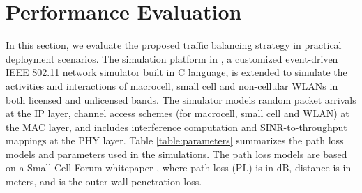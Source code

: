 \documentclass[journal,final,letterpaper,10pt,doublecolumn,twoside]{IEEEtran}
\begin{document}
\section{Performance Evaluation}\label{sec:Femto-system-simulations}

In this section, we evaluate the proposed traffic balancing strategy
in practical deployment scenarios. The simulation platform in
\cite{CoopMAC_WirelessMag2006}\cite{EqualAccess_CoopMAC_Jsac2007}, a
customized event-driven IEEE 802.11 network simulator built in C
language, is extended to simulate the activities and interactions of
macrocell,  small cell and non-cellular WLANs in both licensed and
unlicensed bands. The simulator models random packet arrivals at the
IP layer, channel access schemes (for macrocell, small cell and
WLAN) at the MAC layer, and includes interference computation and
SINR-to-throughput mappings at the PHY layer. Table
\ref{table:parameters} summarizes the path loss models and
parameters used in the simulations. The path loss models are based
on a Small Cell Forum whitepaper \cite{femto-forum-whitepaper}, where
path loss (PL) is in dB, distance  is  in meters, and  is
the outer wall penetration loss.
\end{document}
